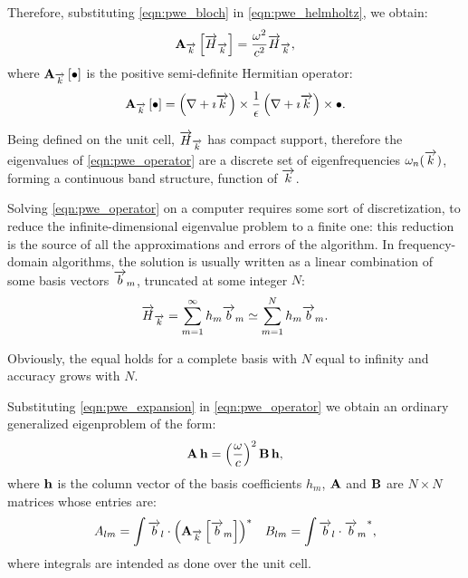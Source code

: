 Therefore, substituting \ref{eqn:pwe_bloch} in \ref{eqn:pwe_helmholtz}, we obtain:
\begin{equation} \label{eqn:pwe_operator}
  \mathbf{A_{\overrightarrow{k}}}\left[\overrightarrow{H}_{\overrightarrow{k}}\right] = \frac{\omega^2}{c^2} \overrightarrow{H}_{\overrightarrow{k}},
\end{equation}
where $\mathbf{A_{\overrightarrow{k}}}\left[\bullet\right]$ is the positive semi-definite Hermitian
operator:
\begin{equation*}
  \mathbf{A_{\overrightarrow{k}}}\left[\bullet\right] =
  {{\left(\nabla + \imath
  \overrightarrow{k}\right) \times \frac{1}{\epsilon}\left(\nabla + \imath
  \overrightarrow{k}\right)} \times \bullet}.
\end{equation*}

Being defined on the unit cell, $\overrightarrow{H}_{\overrightarrow{k}}$ has compact support,
therefore the eigenvalues of \eqref{eqn:pwe_operator} are a discrete
set of eigenfrequencies $\omega_n(\overrightarrow{k})$, forming a continuous band
structure, function of $\overrightarrow{k}$.

Solving \eqref{eqn:pwe_operator} on a computer requires some sort of
discretization, to reduce the infinite-dimensional eigenvalue problem
to a finite one: this reduction is the source of all the
approximations and errors of the algorithm. In frequency-domain
algorithms, the solution is usually
written as a linear combination of some basis vectors $\overrightarrow{b}_m$,
truncated at some integer $N$:
\begin{equation} \label{eqn:pwe_expansion}
\overrightarrow{H}_{\overrightarrow{k}} = \sum_{m=1}^\infty h_m \overrightarrow{b}_m \simeq \sum_{m=1}^N h_m \overrightarrow{b}_m.
\end{equation}

Obviously, the equal holds for a complete basis with $N$ equal to
infinity and accuracy grows with $N$.

Substituting \ref{eqn:pwe_expansion} in \ref{eqn:pwe_operator} we obtain an ordinary
generalized eigenproblem of the form:
\begin{equation} \label{eqn:pwe_eigenproblem}
  {\mathbf{A}\,\mathbf{h}} = \left(\frac{\omega}{c}\right)^2 {\mathbf{B}\,\mathbf{h}},
\end{equation}
where $\mathbf{h}$ is the column vector of the basis coefficients $h_m$,
$\mathbf{A}$ and $\mathbf{B}$ are $N \times N$ matrices whose
entries are:
\begin{align*}
A_{lm} = \int{{\overrightarrow{b}_l \cdot {{\left(\mathbf{A_{\overrightarrow{k}}}\left[\overrightarrow{b}_m\right]\right)}^*}}} && B_{lm} = \int{{\overrightarrow{b}_l \cdot {{{\overrightarrow{b}_m}}^*}}},
\end{align*}
where integrals are intended as done over the unit cell.


